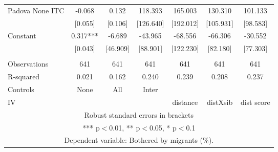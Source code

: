 \begin{tabular}{lcccccc}
Padova None ITC & -0.068 & 0.132 & 118.393 & 165.003 & 130.310 & 101.133 \\
 & [0.055] & [0.106] & [126.640] & [192.012] & [105.931] & [98.583] \\
Constant & 0.317*** & -6.689 & -43.965 & -68.556 & -66.306 & -30.552 \\
 & [0.043] & [46.909] & [88.901] & [122.230] & [82.180] & [77.303] \\
 &  &  &  &  &  &  \\
Observations & 641 & 641 & 641 & 641 & 641 & 641 \\
R-squared & 0.021 & 0.162 & 0.240 & 0.239 & 0.208 & 0.237 \\
Controls & None & All & Inter &  &  &  \\
 IV &  &  &  & distance & distXsib & dist score \\ \hline
\multicolumn{7}{c}{ Robust standard errors in brackets} \\
\multicolumn{7}{c}{ *** p$<$0.01, ** p$<$0.05, * p$<$0.1} \\
\multicolumn{7}{c}{ Dependent variable: Bothered by migrants (\%).} \\
\end{tabular}
